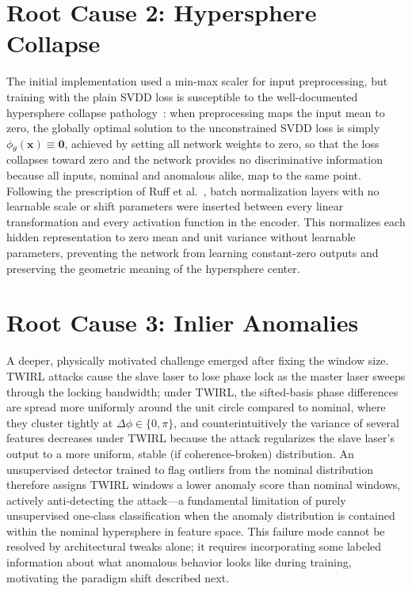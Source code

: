 \documentclass[12pt, a4paper]{report}
\begin{document}
\section{Root Cause 2: Hypersphere Collapse}\label{sec:failure_collapse}
The initial implementation used a min-max scaler for input preprocessing, but training with the plain SVDD loss is susceptible to the well-documented hypersphere collapse pathology~\cite{ruff2018deep}: when preprocessing maps the input mean to zero, the globally optimal solution to the unconstrained SVDD loss is simply $\phi_\theta(\mathbf{x}) \equiv \mathbf{0}$, achieved by setting all network weights to zero, so that the loss collapses toward zero and the network provides no discriminative information because all inputs, nominal and anomalous alike, map to the same point. Following the prescription of Ruff et al.~\cite{ruff2018deep}, batch normalization layers with no learnable scale or shift parameters were inserted between every linear transformation and every activation function in the encoder. This normalizes each hidden representation to zero mean and unit variance without learnable parameters, preventing the network from learning constant-zero outputs and preserving the geometric meaning of the hypersphere center.

\section{Root Cause 3: Inlier Anomalies}\label{sec:failure_inlier}
A deeper, physically motivated challenge emerged after fixing the window size. TWIRL attacks cause the slave laser to lose phase lock as the master laser sweeps through the locking bandwidth; under TWIRL, the sifted-basis phase differences are spread more uniformly around the unit circle compared to nominal, where they cluster tightly at $\Delta\phi \in \{0, \pi\}$, and counterintuitively the variance of several features decreases under TWIRL because the attack regularizes the slave laser's output to a more uniform, stable (if coherence-broken) distribution. An unsupervised detector trained to flag outliers from the nominal distribution therefore assigns TWIRL windows a lower anomaly score than nominal windows, actively anti-detecting the attack—a fundamental limitation of purely unsupervised one-class classification when the anomaly distribution is contained within the nominal hypersphere in feature space. This failure mode cannot be resolved by architectural tweaks alone; it requires incorporating some labeled information about what anomalous behavior looks like during training, motivating the paradigm shift described next.
\end{document}
